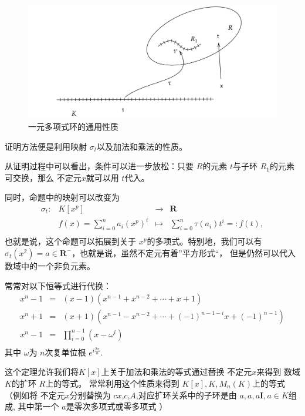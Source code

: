 \begin{figure}
    \centering
    \caption{一元多项式环的通用性质}
    \includegraphics[width=\textwidth]{./pic/chapter1/扩环.png}
\end{figure}
\begin{myrmk}
    证明方法便是利用映射 $\sigma_t$以及加法和乘法的性质。

    从证明过程中可以看出，条件可以进一步放松：只要 $R$的元素 $t$与子环 $R_1$的元素可交换，那么 不定元$x$就可以用 $t$代入。

    同时，命题中的映射可以改变为
    \[
    \begin{array}{rrcl}
    \sigma_{t} : &  K[x^p] & \longrightarrow  & \mathbf{R} \\
                   &  f(x)=\sum_{i=0}^{n}{a_i(x^p)^i}  & \longmapsto    & \sum_{i=0}^{n}{\tau(a_i)t^i}=:f(t), \\
    \end{array}
    \]
    也就是说，这个命题可以拓展到关于 $x^p$的多项式。特别地，我们可以有 $\sigma_t(x^2)=a\in\mathbf{R^-}$，也就是说，虽然不定元有着”平方形式“，
    但是仍然可以代入数域中的一个非负元素。
\end{myrmk}
\begin{myrmk}
    常常对以下恒等式进行代换：
    \[
    \begin{array}{rcl}
        x^n-1&=&(x-1)(x^{n-1}+x^{n-2}+\cdots+x+1)\\
        x^n+1&=&(x+1)(x^{n-1}-x^{n-2}+\cdots+(-1)^{n-1-i}x+(-1)^{n-1})\\
        x^n-1&=&\prod_{i=0}^{n-1}(x-\omega^i)\\
    \end{array}    
    \]
    其中 $\omega$为 $n$次复单位根 $e^{i\frac{2\pi}{n}}$.
\end{myrmk}
这个定理允许我们将$K[x]$上关于加法和乘法的等式通过替换 不定元$x$来得到 数域$K$的扩环 $R$上的等式。
常常利用这个性质来得到 $K[x],K,M_n(K)$上的等式（例如将 不定元$x$分别替换为 $cx$,$c$,$A$,对应扩环关系中的子环是由 $a,a,a\mathbf{I},a\in K$组成,
其中第一个 $a$是零次多项式或零多项式 ）
